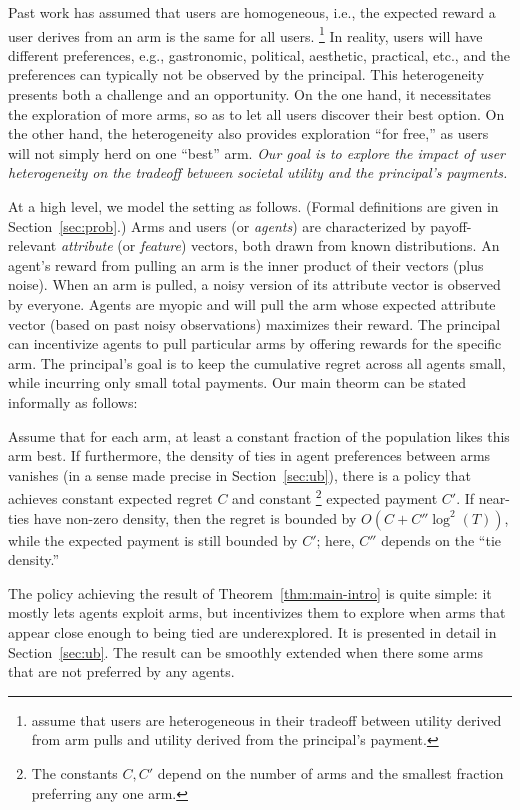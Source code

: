 Past work has assumed that users are homogeneous, i.e., the expected
reward a user derives from an arm is the same for all users.%
\footnote{\citet{han2015incentivizing} assume that users are
heterogeneous in their tradeoff between utility derived from arm pulls
and utility derived from the principal's payment.}
In reality, users will have different preferences, e.g., gastronomic,
political, aesthetic, practical, etc.,
and the preferences can typically not be observed by the principal.
This heterogeneity presents both a challenge and an opportunity.
On the one hand, it necessitates the exploration of more arms,
so as to let all users discover their best option.
On the other hand, the heterogeneity also provides exploration
``for free,'' as users will not simply herd on one ``best'' arm.
\emph{Our goal is to explore the impact of user heterogeneity
on the tradeoff between societal utility and the principal's payments.}

At a high level, we model the setting as follows.
(Formal definitions are given in Section~\ref{sec:prob}.)
Arms and users (or \emph{agents}) are characterized by payoff-relevant
\emph{attribute} (or \emph{feature}) vectors,
both drawn from known distributions.
An agent's reward from pulling an arm is the inner product of their
vectors (plus noise).
When an arm is pulled, a noisy version of its attribute vector is
observed by everyone.
Agents are myopic and will pull the arm whose expected attribute
vector (based on past noisy observations) maximizes their reward.
The principal can incentivize agents to pull particular arms by
offering rewards for the specific arm.
The principal's goal is to keep the cumulative regret across all
agents small, while incurring only small total payments.
Our main theorm can be stated informally as follows:

\begin{theorem} \label{thm:main-intro}
Assume that for each arm, at least a constant fraction of the
population likes this arm best.
If furthermore, the density of ties in agent preferences between arms
vanishes (in a sense made precise in Section~\ref{sec:ub}),
there is a policy that achieves constant
expected regret $C$ and constant%
\footnote{The constants $C,C'$ depend on the number of arms and the
  smallest fraction preferring any one arm.} expected payment $C'$.
If near-ties have non-zero density,
then the regret is bounded by $O(C + C'' \log^2(T))$,
while the expected payment is still bounded by $C'$;
here, $C''$ depends on the ``tie density.''
\end{theorem}

The policy achieving the result of Theorem~\ref{thm:main-intro} is
quite simple: it mostly lets agents exploit arms, but incentivizes
them to explore when arms that appear close enough to being tied are
underexplored. It is presented in detail in Section~\ref{sec:ub}.
The result can be smoothly extended when there some arms that are not
preferred by any agents.


